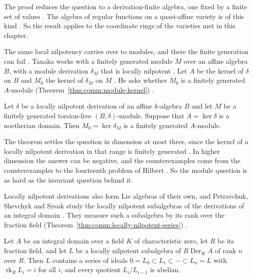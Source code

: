 The proof reduces the question to a derivation-finite algebra, one fixed by
a finite set of values \cite[p.~2]{ChitayatDaigleRegeta2026}. The algebra of
regular functions on a quasi-affine variety is of this kind
\cite[p.~4]{ChitayatDaigleRegeta2026}. So the result applies to the
coordinate rings of the varieties met in this chapter.

The same local nilpotency carries over to modules, and there the finite
generation can fail \cite[p.~1]{Tanaka2010ModuleDerivations}. Tanaka works
with a finitely generated module $M$ over an affine algebra $B$, with a module
derivation $\delta_{M}$ that is locally nilpotent
\cite[p.~1]{Tanaka2010ModuleDerivations}. Let $A$ be the kernel of $\delta$ on
$B$ and $M_{0}$ the kernel of $\delta_{M}$ on $M$
\cite[p.~1]{Tanaka2010ModuleDerivations}. He asks whether $M_{0}$ is a
finitely generated $A$-module (Theorem~\ref{thm:comm:module-kernel})
\cite[p.~2]{Tanaka2010ModuleDerivations}.

\begin{theorem}\label{thm:comm:module-kernel}
Let $\delta$ be a locally nilpotent derivation of an affine $k$-algebra $B$
and let $M$ be a finitely generated torsion-free $(B,\delta)$-module.
Suppose that $A=\ker\delta$ is a noetherian domain. Then $M_{0}=\ker\delta_{M}$
is a finitely generated $A$-module.
\end{theorem}

The theorem settles the question in dimension at most three, since the
kernel of a locally nilpotent derivation in that range is finitely generated
\cite[Corollary~4.7, p.~10]{Tanaka2010ModuleDerivations}. In higher
dimension the answer can be negative, and the counterexamples come from the
counterexamples to the fourteenth problem of Hilbert
\cite[pp.~2--3]{Tanaka2010ModuleDerivations}. So the module question is as
hard as the invariant question behind it.

Locally nilpotent derivations also form Lie algebras of their own, and
Petravchuk, Shevchyk and Sysak study the locally nilpotent subalgebras of
the derivations of an integral domain \cite[p.~1]{PetravchukShevchykSysak2017}.
They measure such a subalgebra by its rank over the fraction field (Theorem~\ref{thm:comm:locally-nilpotent-series})
\cite[p.~1]{PetravchukShevchykSysak2017}.\begin{theorem}\label{thm:comm:locally-nilpotent-series}
Let $A$ be an integral domain over a field $K$ of characteristic zero, let
$R$ be its fraction field, and let $L$ be a locally nilpotent subalgebra of
$R\operatorname{Der}_{K}A$ of rank $n$ over $R$. Then $L$ contains a series
of ideals $0=L_{0}\subset L_{1}\subset\cdots\subset L_{n}=L$ with
$\operatorname{rk}_{R}L_{i}=i$ for all $i$, and every quotient
$L_{i}/L_{i-1}$ is abelian.
\end{theorem}

